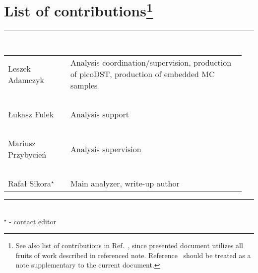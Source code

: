 \section*{\LARGE List of contributions\footnote{See also list of contributions in Ref.~\cite{supplementaryNote}, since presented document utilizes all fruits of work described in referenced note. Reference~\cite{supplementaryNote} should be treated as a note supplementary to the current document.}}%
%
   \rule{\textwidth}{1.0pt}\\[5pt]%
      \begin{tabular}{>{\raggedright}p{0.25\linewidth}p{0.7\linewidth}}
		Leszek Adamczyk & Analysis coordination/supervision, production of picoDST, production of embedded MC samples\\
		~&~\\
		Łukasz Fulek & Analysis support\\
		~&~\\
		Mariusz Przybycień & Analysis supervision\\
		~&~\\
        Rafał Sikora$^{\star}$  & Main analyzer, write-up author\\
      \end{tabular}\newline
   \rule{\textwidth}{1.0pt}\\[10pt]%
   $^{\star}$ - contact editor
   \\[50pt]%
